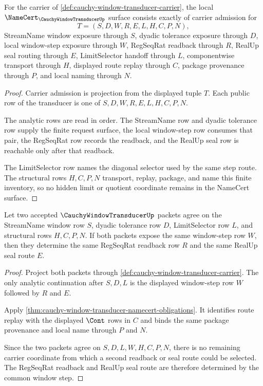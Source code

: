 \begin{theorem}
\label{thm:cauchy-window-transducer-namecert-obligations}
For the carrier of \autoref{def:cauchy-window-transducer-carrier}, the local $\NameCert_{\CauchyWindowTransducerUp}$ surface consists exactly of carrier admission for
$$
T=(S,D,W,R,E,L,H,C,P,N),
$$
StreamName window exposure through $S$, dyadic tolerance exposure through $D$, local window-step exposure through $W$, RegSeqRat readback through $R$, RealUp seal routing through $E$, LimitSelector handoff through $L$, componentwise transport through $H$, displayed route replay through $C$, package provenance through $P$, and local naming through $N$.
\end{theorem}
\begin{proof}
Carrier admission is projection from the displayed tuple $T$. Each public row of the transducer is one of $S,D,W,R,E,L,H,C,P,N$.

The analytic rows are read in order. The StreamName row and dyadic tolerance row supply the finite request surface, the local window-step row consumes that pair, the RegSeqRat row records the readback, and the RealUp seal row is reachable only after that readback.

The LimitSelector row names the diagonal selector used by the same step route. The structural rows $H,C,P,N$ transport, replay, package, and name this finite inventory, so no hidden limit or quotient coordinate remains in the NameCert surface.
\end{proof}

\begin{theorem}
\label{thm:cauchy-window-transducer-window-step-determinacy}
Let two accepted $\CauchyWindowTransducerUp$ packets agree on the StreamName window row $S$, dyadic tolerance row $D$, LimitSelector row $L$, and structural rows $H,C,P,N$. If both packets expose the same window-step row $W$, then they determine the same RegSeqRat readback row $R$ and the same RealUp seal route $E$.
\end{theorem}
\begin{proof}
Project both packets through \autoref{def:cauchy-window-transducer-carrier}. The only analytic continuation after $S,D,L$ is the displayed window-step row $W$ followed by $R$ and $E$.

Apply \autoref{thm:cauchy-window-transducer-namecert-obligations}. It identifies route replay with the displayed $\Cont$ rows in $C$ and binds the same package provenance and local name through $P$ and $N$.

Since the two packets agree on $S,D,L,W,H,C,P,N$, there is no remaining carrier coordinate from which a second readback or seal route could be selected. The RegSeqRat readback and RealUp seal route are therefore determined by the common window step.
\end{proof}

